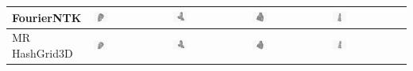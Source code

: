 \begin{table}[H]
\begin{tabularx}{\textwidth}{|p{3.2cm}|X|X|X|X|}
FourierNTK & \includegraphics[width=0.2\textwidth]{images/chapter5_img/MeshReconResults/FourierNTK/65.jpg} & \includegraphics[width=0.2\textwidth]{images/chapter5_img/MeshReconResults/FourierNTK/110.jpg} & \includegraphics[width=0.2\textwidth]{images/chapter5_img/MeshReconResults/FourierNTK/114.jpg} & \includegraphics[width=0.2\textwidth]{images/chapter5_img/MeshReconResults/FourierNTK/122.jpg} \\
\hline
MR HashGrid3D & \includegraphics[width=0.2\textwidth]{images/chapter5_img/MeshReconResults/MRHashGrid3D/65.jpg} & \includegraphics[width=0.2\textwidth]{images/chapter5_img/MeshReconResults/MRHashGrid3D/110.jpg} & \includegraphics[width=0.2\textwidth]{images/chapter5_img/MeshReconResults/MRHashGrid3D/114.jpg} & \includegraphics[width=0.2\textwidth]{images/chapter5_img/MeshReconResults/MRHashGrid3D/122.jpg} \\

\end{tabularx}
\end{table}
